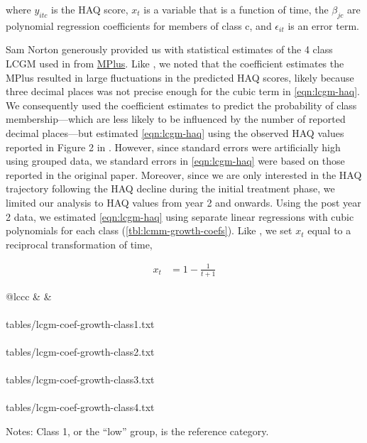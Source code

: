 \documentclass[11pt,final,fleqn]{article}\usepackage[]{graphicx}\usepackage[]{color}
\makeatletter
\theoremstyle{plain}
\newcommand*\ExpandableInput[1]{\@@input#1 }
\makeatother
\begin{document}
\begin{appendices}
where $y_{itc}$ is the HAQ score, $x_t$ is a variable that is a function of time, the $\beta_{jc}$ are polynomial regression coefficients for members of class c, and $\epsilon_{it}$ is an error term.

Sam Norton generously provided us with statistical estimates of the 4 class LCGM used in \citet{norton2014health} from \href{https://www.statmodel.com}{MPlus}. Like \citet{stevenson2016adalimumab}, we noted that the coefficient estimates the MPlus resulted in large fluctuations in the predicted HAQ scores, likely because three decimal places was not precise enough for the cubic term in \autoref{eqn:lcgm-haq}. We consequently used the coefficient estimates to predict the probability of class membership---which are less likely to be influenced by the number of reported decimal places---but estimated \autoref{eqn:lcgm-haq} using the observed HAQ values reported in Figure 2 in \citet{norton2014health}. However, since standard errors were artificially high using grouped data, we standard errors in \autoref{eqn:lcgm-haq} were based on those reported in the original paper. Moreover, since we are only interested in the HAQ trajectory following the HAQ decline during the initial treatment phase, we limited our analysis to HAQ values from year 2 and onwards. Using the post year 2 data, we estimated \autoref{eqn:lcgm-haq} using separate linear regressions with cubic polynomials for each class (\autoref{tbl:lcmm-growth-coefs}). Like \citet{norton2014health}, we set $x_t$ equal to a reciprocal transformation of time,

\begin{align}
x_t &= 1 - \frac{1}{t+1}
\end{align}

\begin{table}[!ht] 
\begin{center}
\begin{threeparttable}
\caption{LCGM HAQ trajectory coefficients} \label{tbl:lcmm-growth-coefs}
\begin{tabularx}{\textwidth}{@{\extracolsep{\fill}}lccc}
\hline
{} &  &   \\
\hline
{} \\
\ExpandableInput{tables/lcgm-coef-growth-class1.txt} \\
 \\
\ExpandableInput{tables/lcgm-coef-growth-class2.txt} \\
 \\
\ExpandableInput{tables/lcgm-coef-growth-class3.txt} \\
 \\
\ExpandableInput{tables/lcgm-coef-growth-class4.txt}
\hline
\end{tabularx}
\scriptsize
Notes: Class 1, or the ``low'' group, is the reference category.
\end{threeparttable}
\end{center}
\end{table}


\end{appendices}
\end{document}
